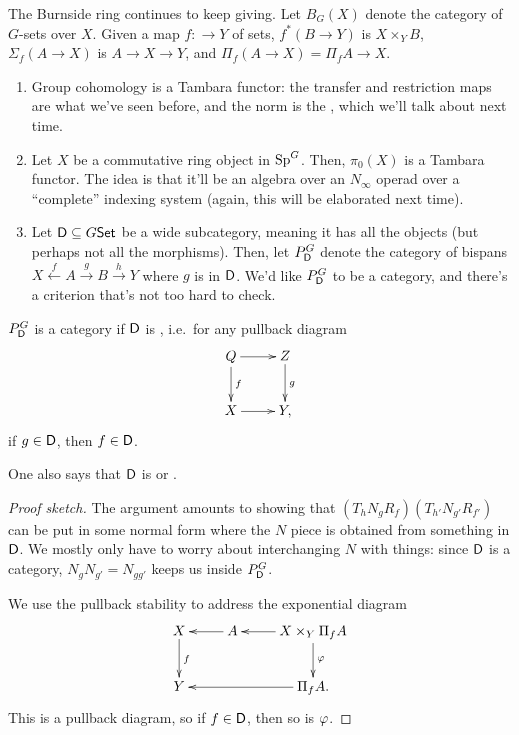 \begin{exm}
The Burnside ring continues to keep giving. Let $B_G(X)$ denote the category of $G$-sets over $X$. Given a map
$f\colon \to Y$ of sets, $f^*(B\to Y)$ is $X\times_Y B$, $\Sigma_f(A\to X)$ is $A\to X\to Y$, and $\Pi_f(A\to X) =
\Pi_fA\to X$.
\end{exm}
\begin{exm}\hfill
\label{Evensexm}
\begin{enumerate}
	\item Group cohomology is a Tambara functor: the transfer and restriction maps are what we've seen before, and
	the norm is the , which we'll talk about next time.
	\item Let $X$ be a commutative ring object in $\mathrm{Sp}^G$. Then, $\pi_0(X)$ is a Tambara functor. The idea is that
	it'll be an algebra over an $N_\infty$ operad over a ``complete'' indexing system (again, this will be
	elaborated next time).
	\item Let $\mathsf D\subseteq G\mathsf{Set}$ be a wide subcategory, meaning it has all the objects (but perhaps not all the
	morphisms). Then, let $P_\mathsf D^G$ denote the category of bispans $X\stackrel f\gets A\stackrel g\to B\stackrel
	h\to Y$ where $g$ is in $\mathsf D$. We'd like $P_\mathsf D^G$ to be a category, and there's a criterion that's not too
	hard to check.\qedhere
\end{enumerate}
\end{exm}
\begin{prop}
$P_\mathsf D^G$ is a category if $\mathsf D$ is , i.e.\ for any pullback diagram
\[\xymatrix{
	Q\ar[r]\ar[d]^f & Z\ar[d]^g\\
	X\ar[r] & Y,
}\]
if $g\in\mathsf D$, then $f\in\mathsf D$.
\end{prop}
One also says that $\mathsf D$ is  or .
\begin{proof}[Proof sketch]
The argument amounts to showing that $(T_h N_g R_f)(T_{h'}N_{g'}R_{f'})$ can be put in some normal form where the
$N$ piece is obtained from something in $\mathsf D$. We mostly only have to worry about interchanging $N$ with things:
since $\mathsf D$ is a category, $N_gN_{g'} = N_{gg'}$ keeps us inside $P_\mathsf D^G$.

We use the pullback stability to address the exponential diagram
\[\xymatrix{
	X\ar[d]^f & A\ar[l] & X\times_Y\Pi_fA\ar[d]^\vp\ar[l]\\
	Y && \Pi_f A.\ar[ll]
}\]
This is a pullback diagram, so if $f\in\mathsf D$, then so is $\varphi$.
\end{proof}

